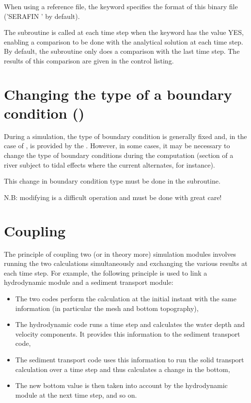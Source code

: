 When using a reference file, the keyword 
specifies the format of this binary file ('SERAFIN ' by default).

The  subroutine is called at each time step
when the keyword  has the value YES,
enabling a comparison to be done with the analytical solution at each time step.
By default, the  subroutine only does a comparison
with the last time step.
The results of this comparison are given in the control listing.


\section{Changing the type of a boundary condition ()}
\label{sec:chang:type:bc:propin}
During a simulation, the type of boundary condition is generally fixed and, in
the case of , is provided by the .
However, in some cases, it may be necessary to change the type of boundary
conditions during the computation (section of a river subject to tidal effects
where the current alternates, for instance).

This change in boundary condition type must be done in the
 subroutine.

N.B: modifying  is a difficult operation
and must be done with great care!


\section{Coupling}
\label{sec:coupling}

The principle of coupling two (or in theory more) simulation modules involves
running the two calculations simultaneously and exchanging the various results
at each time step.
For example, the following principle is used to link a hydrodynamic module
and a sediment transport module:

\begin{itemize}
\item The two codes perform the calculation at the initial instant
with the same information (in particular the mesh and bottom topography),

\item The hydrodynamic code runs a time step and calculates the water depth
and velocity components.
It provides this information to the sediment transport code,

\item The sediment transport code uses this information to run the solid
transport calculation over a time step and thus calculates a change in the
bottom,

\item The new bottom value is then taken into account by the hydrodynamic module
at the next time step, and so on.
\end{itemize}

